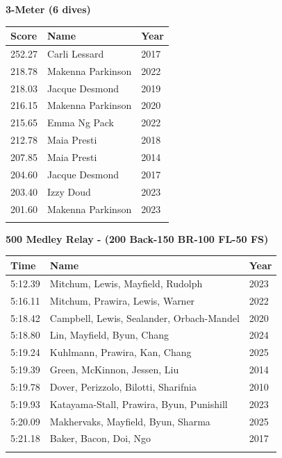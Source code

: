 \noindent\begin{minipage}[t]{0.98\textwidth}
\centering
\textbf{\textcolor{teamprimary}{3-Meter (6 dives)}}\par
\vspace{0.5em}
\centering
\small
\renewcommand{\arraystretch}{1.0}
\setlength{\tabcolsep}{4pt}
\begin{tabular}{@{}p{1.8cm}p{3.0cm}p{1.0cm}@{}}
\toprule
\textbf{Score} & \textbf{Name} & \textbf{Year} \\
\midrule
252.27 & Carli Lessard & 2017 \\
218.78 & Makenna Parkinson & 2022 \\
218.03 & Jacque Desmond & 2019 \\
216.15 & Makenna Parkinson & 2020 \\
215.65 & Emma Ng Pack & 2022 \\
212.78 & Maia Presti & 2018 \\
207.85 & Maia Presti & 2014 \\
204.60 & Jacque Desmond & 2017 \\
203.40 & Izzy Doud & 2023 \\
201.60 & Makenna Parkinson & 2023 \\
\bottomrule
\vspace{0.5em}
\end{tabular}
\end{minipage}
\vspace{1.2em}
\noindent\begin{minipage}[t]{0.98\textwidth}
\centering
\textbf{\textcolor{teamprimary}{500 Medley Relay - (200 Back-150 BR-100 FL-50 FS)}}\par
\vspace{0.5em}
\centering
\small
\renewcommand{\arraystretch}{1.0}
\setlength{\tabcolsep}{4pt}
\begin{tabular}{@{}p{4.5cm}p{8.5cm}p{2.5cm}@{}}
\toprule
\textbf{Time} & \textbf{Name} & \textbf{Year} \\
\midrule
5:12.39 & Mitchum, Lewis, Mayfield, Rudolph & 2023 \\
5:16.11 & Mitchum, Prawira, Lewis, Warner & 2022 \\
5:18.42 & Campbell, Lewis, Sealander, Orbach-Mandel & 2020 \\
5:18.80 & Lin, Mayfield, Byun, Chang & 2024 \\
5:19.24 & Kuhlmann, Prawira, Kan, Chang & 2025 \\
5:19.39 & Green, McKinnon, Jessen, Liu & 2014 \\
5:19.78 & Dover, Perizzolo, Bilotti, Sharifnia & 2010 \\
5:19.93 & Katayama-Stall, Prawira, Byun, Punishill & 2023 \\
5:20.09 & Makhervaks, Mayfield, Byun, Sharma & 2025 \\
5:21.18 & Baker, Bacon, Doi, Ngo & 2017 \\
\bottomrule
\vspace{0.5em}
\end{tabular}
\end{minipage}
